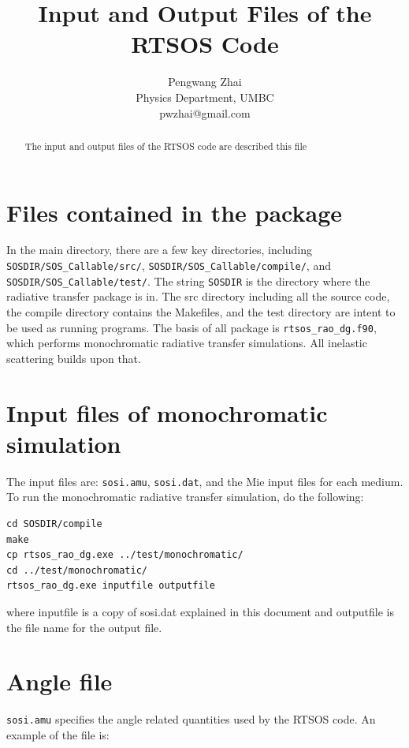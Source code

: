 \documentclass[10pt,letterpaper]{article}
\title{Input and Output Files of the RTSOS Code}
\author{Pengwang Zhai \\ Physics Department, UMBC \\ pwzhai@gmail.com}
\begin{document}
\maketitle

\begin{abstract}
The input and output files of the RTSOS code are described this file
\end{abstract}


\section{Files contained in the package}
In the main directory, there are a few key directories, including \verb"SOSDIR/SOS_Callable/src/", \verb"SOSDIR/SOS_Callable/compile/", and \verb"SOSDIR/SOS_Callable/test/". The string \verb"SOSDIR" is the directory where the radiative transfer package is in. The src directory including all the source code, the compile directory contains the Makefiles, and the test directory are intent to be used as running programs. The basis of all package is \verb"rtsos_rao_dg.f90", which performs monochromatic radiative transfer simulations. All inelastic scattering builds upon that.

\section{Input files of monochromatic simulation}
The input files are: \verb"sosi.amu", \verb"sosi.dat",  and the Mie input files for each medium. To run the monochromatic radiative transfer simulation, do the following:

\begin{verbatim}
cd SOSDIR/compile
make
cp rtsos_rao_dg.exe ../test/monochromatic/
cd ../test/monochromatic/
rtsos_rao_dg.exe inputfile outputfile
\end{verbatim}

\noindent where inputfile is a copy of sosi.dat explained in this document and outputfile is the file name for the output file.

\section{Angle file}
\verb"sosi.amu" specifies the angle related quantities used by the RTSOS code.  An example of the file is:
\end{document}
